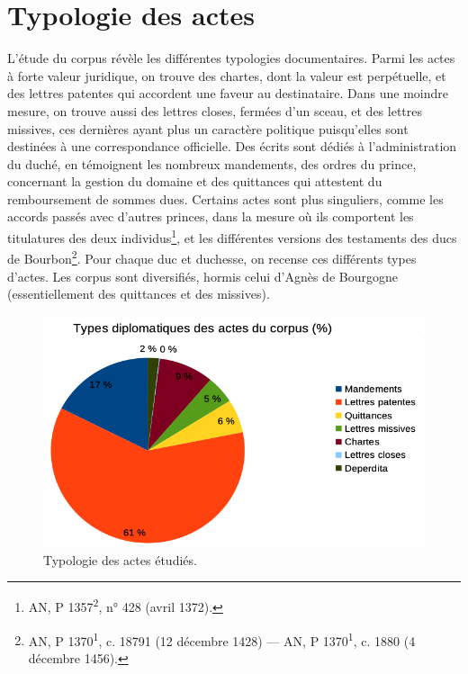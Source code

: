 \section{Typologie des actes}
\label{I.1.3}

\par L'étude du corpus révèle les différentes typologies documentaires. Parmi les actes à forte valeur juridique, on trouve des chartes, dont la valeur est perpétuelle, et des lettres patentes qui accordent une faveur au destinataire. Dans une moindre mesure, on trouve aussi des lettres closes, fermées d'un sceau, et des lettres missives, ces dernières ayant plus un caractère politique puisqu'elles sont destinées à une correspondance officielle. Des écrits sont dédiés à l'administration du duché, en témoignent les nombreux mandements, des ordres du prince, concernant la gestion du domaine et des quittances qui attestent du remboursement de sommes dues. Certains actes sont plus singuliers, comme les accords passés avec d'autres princes, dans la mesure où ils comportent les titulatures des deux individus\footnote{AN, P 1357\textsuperscript{2}, n° 428 (avril 1372).}, et les différentes versions des testaments des ducs de Bourbon\footnote{AN, P 1370\textsuperscript{1}, c. 18791 (12 décembre 1428) — AN, P 1370\textsuperscript{1}, c. 1880 (4 décembre 1456).}. Pour chaque duc et duchesse, on recense ces différents types d'actes. Les corpus sont diversifiés, hormis celui d'Agnès de Bourgogne (essentiellement des quittances et des missives). 
\newline 

\begin{figure}[ht]
\centering
\includegraphics[scale=0.6]{img/typologie_documentaire.png}
\caption{Typologie des actes étudiés.}
\label{fig:typo_actes}
\end{figure}
\newpage 

